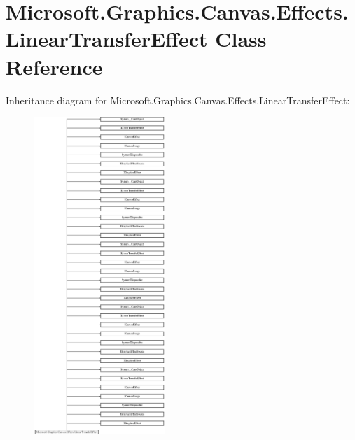 \hypertarget{class_microsoft_1_1_graphics_1_1_canvas_1_1_effects_1_1_linear_transfer_effect}{}\section{Microsoft.\+Graphics.\+Canvas.\+Effects.\+Linear\+Transfer\+Effect Class Reference}
\label{class_microsoft_1_1_graphics_1_1_canvas_1_1_effects_1_1_linear_transfer_effect}
Inheritance diagram for Microsoft.\+Graphics.\+Canvas.\+Effects.\+Linear\+Transfer\+Effect\+:\begin{figure}[H]
\begin{center}
\leavevmode
\includegraphics[height=12.000000cm]{class_microsoft_1_1_graphics_1_1_canvas_1_1_effects_1_1_linear_transfer_effect}
\end{center}
\end{figure}

